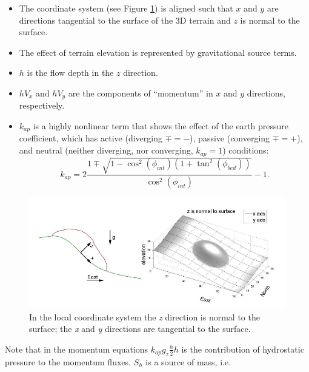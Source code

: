 \documentclass[letterpaper,10pt]{article}
\begin{document}
\begin{itemize}
        \item The coordinate system (see Figure \ref{xzeast}) is aligned such that $x$ and $y$ are directions tangential  
              to the surface of the 3D terrain and $z$ is normal to the surface.
        \item The effect of terrain elevation is represented by gravitational source terms. 
        \item $h$ is the flow depth in the $z$ direction.
        \item $hV_x$ and $hV_y$ are the components of ``momentum'' in $x$ and $y$ directions, respectively.
        \item{ $k_{ap}$ is a highly nonlinear term that shows the effect of the earth pressure coefficient, which has active 
              (diverging $\mp=-$), passive (converging $\mp=+$), and neutral (neither diverging, nor converging, $k_{ap}=1$) conditions:
              \begin{equation}
                        k_{ap}=2\frac{1\mp\sqrt{1-\cos^2(\phi_{int})\left(1+\tan^2(\phi_{bed})\right)}}{\cos^2(\phi_{int})}-1.
                \end{equation}
             }
             
\end{itemize}
\begin{figure}[!t]
        \begin{center}
                 \includegraphics[height=2.8 truein]{IMAGES/1.jpg}
                \caption{In the local coordinate system the {\itshape z} direction is normal to the surface; 
                the {\itshape x} and {\itshape y} directions are tangential to the surface.}
                \label{xzeast}
        \end{center}
\end{figure}
Note that in the momentum equations $k_{ap}g_z\frac{h}{2}h$ is the contribution of hydrostatic 
pressure to the momentum fluxes. $S_h$ is a source of mass, i.e. 
\end{document}
